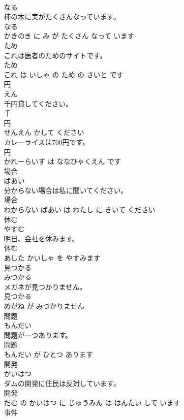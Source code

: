 \documentclass[8pt]{extreport}
\begin{document}
\begin{CJK}{UTF8}{min}
\\	なる	
\\	柿の木に実がたくさんなっています。	
\\	なる 
\\	かきのき に み が たくさん なって います			
\\	ため	
\\	これは医者のためのサイトです。	
\\	ため 
\\	これ は いしゃ の ため の さいと です			
\\	円	
\\	えん			
\\	千円貸してください。	
\\	千 
\\	円 
\\	せんえん かして ください			
\\	カレーライスは700円です。	
\\	円 
\\	かれーらいす は ななひゃくえん です			
\\	場合	
\\	ばあい			
\\	分からない場合は私に聞いてください。	
\\	場合 
\\	わからない ばあい は わたし に きいて ください			
\\	休む	
\\	やすむ			
\\	明日、会社を休みます。	
\\	休む 
\\	あした かいしゃ を やすみます			
\\	見つかる	
\\	みつかる			
\\	メガネが見つかりません。	
\\	見つかる 
\\	めがね が みつかりません			
\\	問題	
\\	もんだい			
\\	問題が一つあります。	
\\	問題 
\\	もんだい が ひとつ あります			
\\	開発	
\\	かいはつ			
\\	ダムの開発に住民は反対しています。	
\\	開発 
\\	だむ の かいはつ に じゅうみん は はんたい して います			
\\	事件	

\end{CJK}
\end{document}
